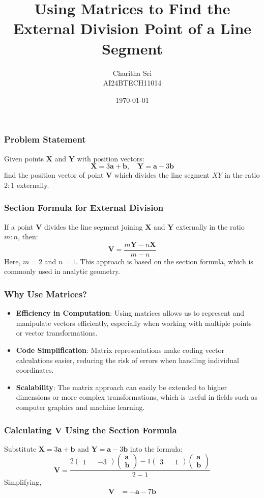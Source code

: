 \documentclass{beamer}
\title{Using Matrices to Find the External Division Point of a Line Segment}
\author{Charitha Sri \\ AI24BTECH11014}
\date{\today}
\theoremstyle{remark}
\newcommand{\myvec}[1]{\ensuremath{\begin{pmatrix}#1\end{pmatrix}}}
\let\vec\mathbf
\numberwithin{equation}{section}
\begin{document}
\begin{frame}
    \titlepage
\end{frame}

\begin{frame}
    \frametitle{Problem Statement}
    Given points $\vec{X}$ and $\vec{Y}$ with position vectors:
    \[
    \vec{X} = 3\vec{a} + \vec{b}, \quad \vec{Y} = \vec{a} - 3\vec{b}
    \]
    find the position vector of point $\vec{V}$ which divides the line segment $XY$ in the ratio $2 : 1$ externally.
\end{frame}

\begin{frame}
    \frametitle{Section Formula for External Division}
    If a point $\vec{V}$ divides the line segment joining $\vec{X}$ and $\vec{Y}$ externally in the ratio $m : n$, then:
    \[
    \vec{V} = \frac{m\vec{Y} - n\vec{X}}{m - n}
    \]
    Here, $m = 2$ and $n = 1$. This approach is based on the section formula, which is commonly used in analytic geometry.
\end{frame}

\begin{frame}
    \frametitle{Why Use Matrices?}
    \begin{itemize}
        \item \textbf{Efficiency in Computation}: Using matrices allows us to represent and manipulate vectors efficiently, especially when working with multiple points or vector transformations.
        \item \textbf{Code Simplification}: Matrix representations make coding vector calculations easier, reducing the risk of errors when handling individual coordinates.
        \item \textbf{Scalability}: The matrix approach can easily be extended to higher dimensions or more complex transformations, which is useful in fields such as computer graphics and machine learning.
    \end{itemize}
\end{frame}

\begin{frame}
    \frametitle{Calculating $\vec{V}$ Using the Section Formula}
    Substitute $\vec{X} = 3\vec{a} + \vec{b}$ and $\vec{Y} = \vec{a} - 3\vec{b}$ into the formula:
    \[
    \vec{V} = \frac{2\myvec{ 1 && -3} \myvec{\vec{a} \\ \vec{b}} - 1 \myvec{3 && 1} \myvec{\vec{a} \\ \vec{b}}}{2 - 1}
    \]
    Simplifying,
    \begin{align}
    \label{eq: Position vector on X and Y}
        \vec{V} &= -\vec{a} - 7\vec{b}
    \end{align}
\end{frame}
\end{document}
